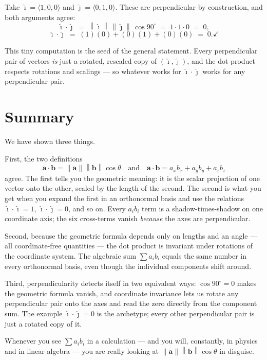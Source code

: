 \documentclass[11pt]{article}
\newcommand{\vect}[1]{\mathbf{#1}}
\newcommand{\ihat}{\hat{\imath}}
\newcommand{\jhat}{\hat{\jmath}}
\newcommand{\norm}[1]{\left\lVert #1 \right\rVert}
\begin{document}
Take $\ihat = \langle 1,0,0\rangle$ and $\jhat = \langle 0,1,0\rangle$. These are perpendicular by construction, and both arguments agree:
\[
  \ihat\cdot\jhat \;=\; \norm{\ihat}\,\norm{\jhat}\,\cos 90^\circ \;=\; 1\cdot 1\cdot 0 \;=\; 0,
\]
\[
  \ihat\cdot\jhat \;=\; (1)(0) + (0)(1) + (0)(0) \;=\; 0. \checkmark
\]

This tiny computation is the seed of the general statement. Every perpendicular pair of vectors \emph{is} just a rotated, rescaled copy of $(\ihat, \jhat)$, and the dot product respects rotations and scalings — so whatever works for $\ihat\cdot\jhat$ works for any perpendicular pair.

\section{Summary}

We have shown three things.

First, the two definitions
\[
  \vect{a}\cdot\vect{b} = \norm{\vect{a}}\norm{\vect{b}}\cos\theta \quad\text{and}\quad \vect{a}\cdot\vect{b} = a_x b_x + a_y b_y + a_z b_z
\]
agree. The first tells you the geometric meaning: it is the scalar projection of one vector onto the other, scaled by the length of the second. The second is what you get when you expand the first in an orthonormal basis and use the relations $\ihat\cdot\ihat=1$, $\ihat\cdot\jhat=0$, and so on. Every $a_i b_i$ term is a shadow-times-shadow on one coordinate axis; the six cross-terms vanish \emph{because} the axes are perpendicular.

Second, because the geometric formula depends only on lengths and an angle — all coordinate-free quantities — the dot product is invariant under rotations of the coordinate system. The algebraic sum $\sum a_i b_i$ equals the same number in every orthonormal basis, even though the individual components shift around.

Third, perpendicularity detects itself in two equivalent ways: $\cos 90^\circ = 0$ makes the geometric formula vanish, and coordinate invariance lets us rotate any perpendicular pair onto the axes and read the zero directly from the component sum. The example $\ihat\cdot\jhat = 0$ is the archetype; every other perpendicular pair is just a rotated copy of it.

Whenever you see $\sum a_i b_i$ in a calculation — and you will, constantly, in physics and in linear algebra — you are really looking at $\norm{\vect{a}}\norm{\vect{b}}\cos\theta$ in disguise.
\end{document}
